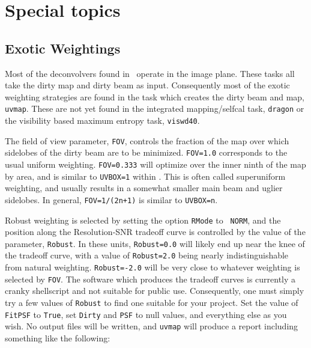 \newpage
\section{Special topics}

\subsection{Exotic Weightings}
Most of the deconvolvers found in \sde\ operate in the image plane.  These
tasks all take the dirty map and dirty beam as input.  Consequently most of
the exotic weighting strategies are found in the task which creates the
dirty beam and map, {\tt uvmap}.  These are not yet found in the integrated
mapping/selfcal task, {\tt dragon} or the visibility based maximum entropy
task, {\tt viswd40}.

The field of view parameter, {\tt FOV}, controls the fraction of the map
over which sidelobes of the dirty beam are to be minimized.  {\tt FOV=1.0}
corresponds to the usual uniform weighting.  {\tt FOV=0.333} will optimize
over the inner ninth of the map by area, and is similar to {\tt UVBOX=1}
within \aips.  This is often called superuniform weighting, and usually
results in a somewhat smaller main beam and uglier sidelobes.  In general,
{\tt FOV=1/(2n+1)} is similar to {\tt UVBOX=n}.

Robust weighting is selected by setting the option {\tt RMode} to {\tt
NORM}, and the position along the Resolution-SNR tradeoff curve is
controlled by the value of the parameter, {\tt Robust}.  In these units,
{\tt Robust=0.0} will likely end up near the knee of the tradeoff curve,
with a value of {\tt Robust=2.0} being nearly indistinguishable from
natural weighting.  {\tt Robust=-2.0} will be very close to whatever
weighting is selected by {\tt FOV}.  The software which produces the
tradeoff curves is currently a cranky shellscript and not suitable for
public use.  Consequently, one must simply try a few values of {\tt Robust}
to find one suitable for your project.  Set the value of {\tt FitPSF} to
{\tt True}, set {\tt Dirty} and {\tt PSF} to null values, and everything
else as you wish.  No output files will be written, and {\tt uvmap} will
produce a report including something like the following:

